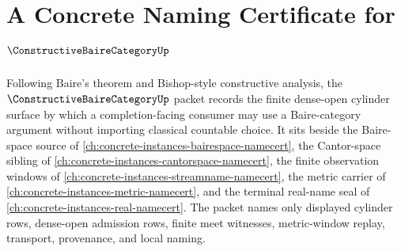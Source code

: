 \chapter{A Concrete Naming Certificate for $\ConstructiveBaireCategoryUp$}
\label{ch:concrete-instances-constructive-baire-category-namecert}

Following Baire's theorem and Bishop-style constructive analysis, the $\ConstructiveBaireCategoryUp$ packet records the finite dense-open cylinder surface by which a completion-facing consumer may use a Baire-category argument without importing classical countable choice. It sits beside the Baire-space source of \autoref{ch:concrete-instances-bairespace-namecert}, the Cantor-space sibling of \autoref{ch:concrete-instances-cantorspace-namecert}, the finite observation windows of \autoref{ch:concrete-instances-streamname-namecert}, the metric carrier of \autoref{ch:concrete-instances-metric-namecert}, and the terminal real-name seal of \autoref{ch:concrete-instances-real-namecert}. The packet names only displayed cylinder rows, dense-open admission rows, finite meet witnesses, metric-window replay, transport, provenance, and local naming.

